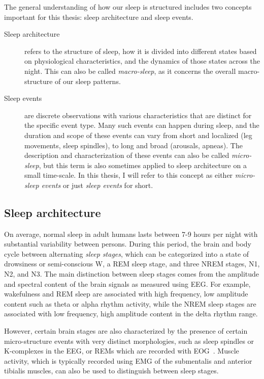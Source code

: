        The general understanding of how our sleep is structured includes two concepts important for this thesis: sleep architecture and sleep events.
        \begin{description}
            \item[Sleep architecture] refers to the structure of sleep, how it is divided into different states based on physiological characteristics, and the dynamics of those states across the night.
            This can also be called \textit{macro-sleep}, as it concerns the overall macro-structure of our sleep patterns.
            \item[Sleep events] are discrete observations with various characteristics that are distinct for the specific event type.
            Many such events can happen during sleep, and the duration and scope of these events can vary from short and localized (leg movements, sleep spindles), to long and broad (arousals, apneas).
            The description and characterization of these events can also be called \textit{micro-sleep}, but this term is also sometimes applied to sleep architecture on a small time-scale.
            In this thesis, I will refer to this concept as either \textit{micro-sleep events} or just \textit{sleep events} for short.
        \end{description}
        
        \subsection{Sleep architecture}\label{sec:sleep-architecture}
            On average, normal sleep in adult humans lasts between 7-9 hours per night with substantial variability between persons. 
            During this period, the brain and body cycle between alternating \textit{sleep stages}, which can be categorized into a state of drowsiness or semi-conscious \ac{W}, a \ac{REM} sleep stage, and three \ac{NREM} stages, \ac{N1}, \ac{N2}, and \ac{N3}.
            The main distinction between sleep stages comes from the amplitude and spectral content of the brain signals as measured using \ac{EEG}. 
            For example, wakefulness and \ac{REM} sleep are associated with high frequency, low amplitude content such as theta or alpha rhythm activity, while the \ac{NREM} sleep stages are associated with low frequency, high amplitude content in the delta rhythm range. 
            
            However, certain brain stages are also characterized by the presence of certain micro-structure events with very distinct morphologies, such as sleep spindles or K-complexes in the \ac{EEG}, or \acp{REM} which are recorded with \ac{EOG}~\citep{Brown2012, Saper2010, Carskadon2011}. 
            Muscle activity, which is typically recorded using \ac{EMG} of the submentalis and anterior tibialis muscles, can also be used to distinguish between sleep stages.
            
